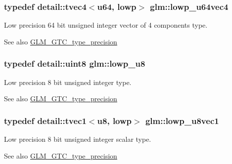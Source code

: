 \subsubsection[{\texorpdfstring{lowp\+\_\+u64vec4}{lowp_u64vec4}}]{\setlength{\rightskip}{0pt plus 5cm}typedef detail\+::tvec4$<$u64, lowp$>$ {\bf glm\+::lowp\+\_\+u64vec4}}\hypertarget{group__gtc__type__precision_ga1dc6d791a39dc52ee296a891d5b9b084}{}\label{group__gtc__type__precision_ga1dc6d791a39dc52ee296a891d5b9b084}
Low precision 64 bit unsigned integer vector of 4 components type. \begin{DoxySeeAlso}{See also}
\hyperlink{group__gtc__type__precision}{G\+L\+M\+\_\+\+G\+T\+C\+\_\+type\+\_\+precision} 
\end{DoxySeeAlso}
\subsubsection[{\texorpdfstring{lowp\+\_\+u8}{lowp_u8}}]{\setlength{\rightskip}{0pt plus 5cm}typedef detail\+::uint8 {\bf glm\+::lowp\+\_\+u8}}\hypertarget{group__gtc__type__precision_gae63f942c49a30dbf266b2f13f3efe257}{}\label{group__gtc__type__precision_gae63f942c49a30dbf266b2f13f3efe257}
Low precision 8 bit unsigned integer type. \begin{DoxySeeAlso}{See also}
\hyperlink{group__gtc__type__precision}{G\+L\+M\+\_\+\+G\+T\+C\+\_\+type\+\_\+precision} 
\end{DoxySeeAlso}
\subsubsection[{\texorpdfstring{lowp\+\_\+u8vec1}{lowp_u8vec1}}]{\setlength{\rightskip}{0pt plus 5cm}typedef detail\+::tvec1$<$u8, lowp$>$ {\bf glm\+::lowp\+\_\+u8vec1}}\hypertarget{group__gtc__type__precision_gaee3cba2c93fa8cb7295671908995197c}{}\label{group__gtc__type__precision_gaee3cba2c93fa8cb7295671908995197c}
Low precision 8 bit unsigned integer scalar type. \begin{DoxySeeAlso}{See also}
\hyperlink{group__gtc__type__precision}{G\+L\+M\+\_\+\+G\+T\+C\+\_\+type\+\_\+precision} 
\end{DoxySeeAlso}
